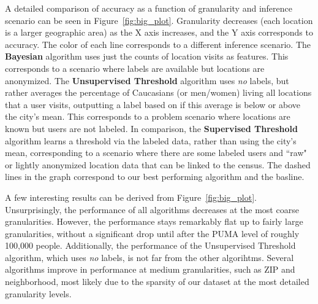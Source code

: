A detailed comparison of accuracy as a function of granularity and inference scenario can be seen in Figure~\ref{fig:big_plot}.
Granularity decreases (each location is a larger geographic area) as the X axis increases, and the Y axis corresponds to accuracy.
The color of each line corresponds to a different inference scenario.
The \textbf{Bayesian} algorithm uses just the counts of location visits as features.
This corresponds to a scenario where labels are available but locations are anonymized.
The \textbf{Unsupervised Threshold} algorithm uses \emph{no} labels, but rather averages the percentage of Caucasians (or men/women) living all locations that a user visits, outputting a label based on if this average is below or above the city's mean.
This corresponds to a problem scenario where locations are known but users are not labeled.
In comparison, the \textbf{Supervised Threshold} algorithm learns a threshold via the labeled data, rather than using the city's mean, corresponding to a scenario where there are some labeled users and ``raw" or lightly anonymized location data that can be linked to the census.
The dashed lines in the graph correspond to our best performing algorithm and the basline.

A few interesting results can be derived from Figure~\ref{fig:big_plot}.
Unsurprisingly, the performance of all algorithms decreases at the most coarse granularities. 
However, the performance stays remarkably flat up to fairly large granularities, without a significant drop until after the PUMA level of roughly 100,000 people.
Additionally, the performance of the Unsupervised Threshold algorithm, which uses \emph{no} labels, is not far from the other algorihtms.
Several algorithms improve in performance at medium granularities, such as ZIP and neighborhood, most likely due to the sparsity of our dataset at the most detailed granularity levels.

